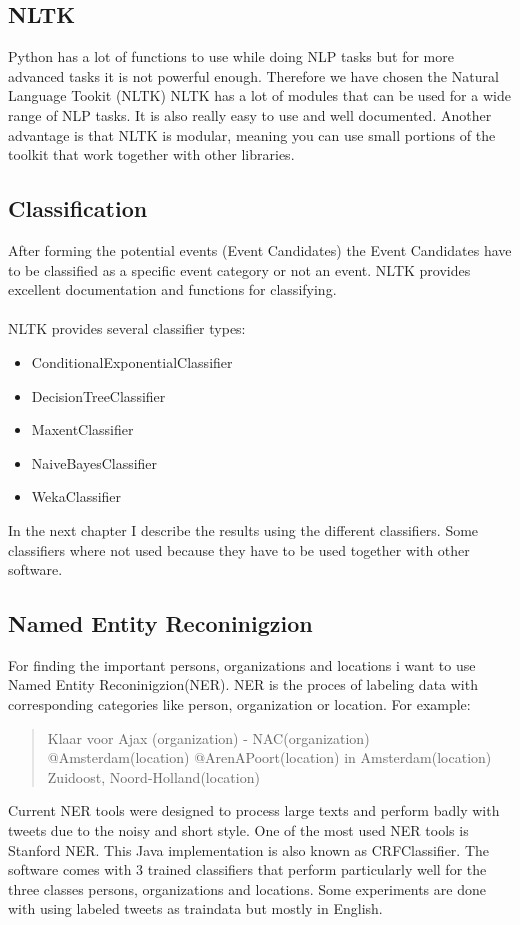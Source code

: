 \documentclass[
10pt, %
a4paper, %
oneside, %
headinclude,footinclude, %
BCOR5mm, %
]{scrartcl}
\begin{document}
\subsection{NLTK}
Python has a lot of functions to use while doing NLP tasks but for more advanced tasks it is not powerful enough. Therefore we have chosen the Natural Language Tookit (NLTK) %
NLTK has a lot of modules that can be used for a wide range of NLP tasks. It is also really easy to use and well documented. Another advantage is that NLTK is modular, meaning you can use small portions of the toolkit that work together with other libraries.

\subsection{Classification}
After forming the potential events (Event Candidates) the Event Candidates have to be classified as a specific event category or not an event.  NLTK provides excellent documentation and functions for classifying. \\\\  NLTK provides several classifier types:

\begin{itemize}[noitemsep]
\item ConditionalExponentialClassifier
\item DecisionTreeClassifier
\item MaxentClassifier
\item NaiveBayesClassifier
\item WekaClassifier
\end{itemize}

In the next chapter I describe the results using the different classifiers. Some classifiers where not used because they have to be used together with other software.


\subsection{Named Entity Reconinigzion}
For finding the important persons, organizations and locations i want to use Named Entity Reconinigzion(NER). NER is the proces of labeling data with corresponding categories like person, organization or location. For example:

\begin {quote}
Klaar voor Ajax (organization) - NAC(organization) @Amsterdam(location) @ArenAPoort(location) in Amsterdam(location) Zuidoost, Noord-Holland(location)
\end{quote}
Current NER tools were designed to process large texts and perform badly with tweets due to the noisy and short style. One of the most used NER tools is Stanford NER. This Java implementation is also known as CRFClassifier. The software comes with 3 trained classifiers that perform particularly well for the three classes persons, organizations and locations. Some experiments are done with using labeled tweets as traindata but mostly in English.  
\end{document}
